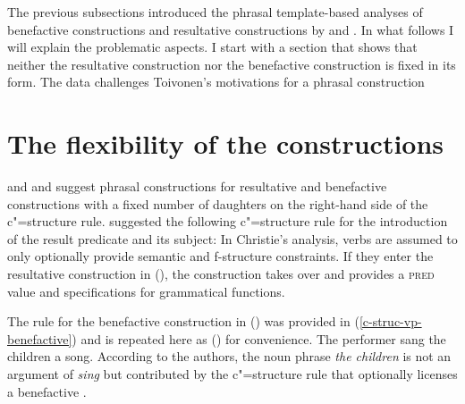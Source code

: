 The previous subsections introduced the phrasal template-based analyses of benefactive constructions
and resultative constructions by \citet{AGT2014a} and \citet{Christie2010a}. In what follows I will
explain the problematic aspects. I start with a section that shows that neither the resultative
construction nor the benefactive construction is fixed in its form. The data challenges Toivonen's
motivations for a phrasal construction \citep{Toivonen2013a}

\chapter{The flexibility of the constructions}
\label{sec-flexibility}

\citet{Christie2010a} and \citet{Toivonen2013a} and \citet{AGT2014a} suggest phrasal constructions
for resultative and benefactive constructions with a fixed number of daughters on the right-hand
side of the c"=structure rule. \citet{Christie2010a} suggested the following c"=structure rule for the introduction of the result
predicate and its subject:
\ea
\label{c-structure-resultative-christie}
\z
In Christie's analysis, verbs are assumed to only optionally provide semantic and f-structure
constraints. If they enter the resultative construction in (), the construction takes over
and provides a \textsc{pred} value and specifications for grammatical functions.

The rule for the benefactive construction in () was provided in
(\ref{c-struc-vp-benefactive}) and is repeated here as () for convenience.
\ea
The performer sang the children a song.
\z
\ea\label{c-struc-vp-benefactive-too}
\z
According to the authors, the noun phrase \emph{the children} is not an argument of \emph{sing} but
contributed by the c"=structure rule that optionally licenses a benefactive \citep[]{AGT2014a}.

